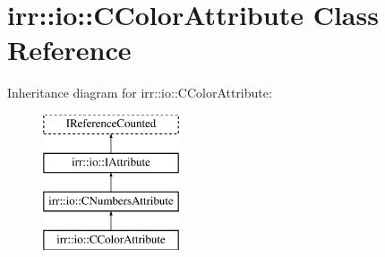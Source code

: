 \hypertarget{classirr_1_1io_1_1_c_color_attribute}{\section{irr\-:\-:io\-:\-:C\-Color\-Attribute Class Reference}
\label{classirr_1_1io_1_1_c_color_attribute}
}
Inheritance diagram for irr\-:\-:io\-:\-:C\-Color\-Attribute\-:\begin{figure}[H]
\begin{center}
\leavevmode
\includegraphics[height=4.000000cm]{classirr_1_1io_1_1_c_color_attribute}
\end{center}
\end{figure}

